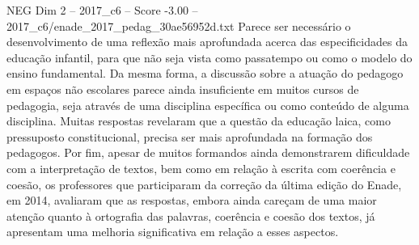 \begin{textsample}{NEG Dim 2 – 2017\_c6 – Score -3.00 – 2017\_c6/enade\_2017\_pedag\_30ae56952d.txt}
Parece ser necessário o desenvolvimento de uma reflexão mais aprofundada acerca das especificidades da educação infantil, para que não seja vista como passatempo ou como o modelo do ensino fundamental.
Da mesma forma, a discussão sobre a atuação do pedagogo em espaços não escolares parece ainda insuficiente em muitos cursos de pedagogia, seja através de uma disciplina específica ou como conteúdo de alguma disciplina.
Muitas respostas revelaram que a questão da educação laica, como pressuposto constitucional, precisa ser mais aprofundada na formação dos pedagogos.
Por fim, apesar de muitos formandos ainda demonstrarem dificuldade com a interpretação de textos, bem como em relação à escrita com coerência e coesão, os professores que participaram da correção da última edição do Enade, em 2014, avaliaram que as respostas, embora ainda careçam de uma maior atenção quanto à ortografia das palavras, coerência e coesão dos textos, já apresentam uma melhoria significativa em relação a esses aspectos.

\end{textsample}
